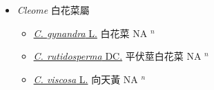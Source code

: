 
  \begin{itemize}
 \item[] \textit{Cleome} 白花菜屬
                    
  \begin{itemize}
        \item[] \href{http://www.theplantlist.org/tpl1.1/search?q=Cleome+gynandra}{\textit{C. gynandra} L.}   白花菜 NA $^n$
        \item[] \href{http://www.theplantlist.org/tpl1.1/search?q=Cleome+rutidosperma}{\textit{C. rutidosperma} DC.}   平伏莖白花菜 NA $^n$
        \item[] \href{http://www.theplantlist.org/tpl1.1/search?q=Cleome+viscosa}{\textit{C. viscosa} L.}   向天黃 NA $^n$
  \end{itemize}
  \end{itemize}

